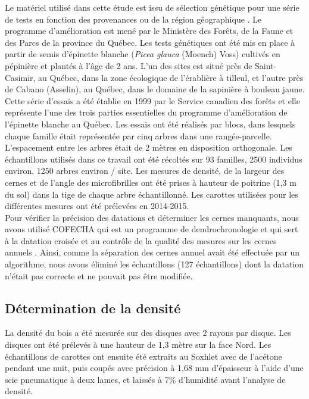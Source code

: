 \documentclass[a4paper,12pt]{report}
\begin{document}
Le matériel utilisé dans cette étude est issu de sélection génétique pour une série de tests en fonction des provenances ou de la région géographique \citep{Beaulieu1996}. Le programme d’amélioration est mené par le Ministère des Forêts, de la Faune et des Parcs de la province du Québec. Les tests génétiques ont été mis en place à partir de semis d'épinette blanche (\textit{Picea glauca} (Moench) Voss) cultivés en pépinière et plantés à l'âge de 2 ans. L'un des sites est situé près de Saint-Casimir, au Québec, dans la zone écologique de l'érablière à tilleul, et l'autre près de Cabano (Asselin), au Québec, dans le domaine de la sapinière à bouleau jaune. Cette série d'essais a été établie en 1999 par le Service canadien des forêts et elle représente l'une des trois parties essentielles du programme d'amélioration de l'épinette blanche au Québec. Les essais ont été réalisés par blocs, dans lesquels chaque famille était représentée par cinq arbres dans une rangée-parcelle. L'espacement entre les arbres était de 2 mètres en disposition orthogonale. Les échantillons utilisés dans ce travail ont été récoltés sur 93 familles, 2500  individus environ, 1250 arbres environ / site. Les mesures de densité, de la largeur des cernes et de l'angle des microfibrilles ont été prises à hauteur de poitrine (1,3 m du sol) dans la tige de chaque arbre échantillonné. Les carottes utilisées pour les différentes mesures ont été prélevées en 2014-2015.  \\ 

Pour vérifier la précision des datations et déterminer les cernes manquants, nous avons utilisé COFECHA qui est un programme de dendrochronologie et qui sert à la datation croisée et au contrôle de la qualité des mesures sur les cernes annuels \citep{HOLMES1983}. Ainsi, comme la séparation des cernes annuel avait été effectuée par un algorithme, nous avons éliminé les échantillons (127 échantillons) dont la datation n'était pas correcte et ne pouvait pas être modifiée. %

\subsection*{Détermination de la densité}\label{densité}
La densité du bois a été mesurée sur des disques avec 2 rayons par disque. Les disques ont été prélevés à une hauteur de 1,3 mètre sur la face Nord. Les échantillons de carottes ont ensuite été extraits au Soxhlet avec de l'acétone pendant une nuit, puis coupés avec précision à 1,68 mm d'épaisseur à l'aide d'une scie pneumatique à deux lames, et laissés à 7\% d'humidité avant l'analyse de densité.\\
 
\end{document}

